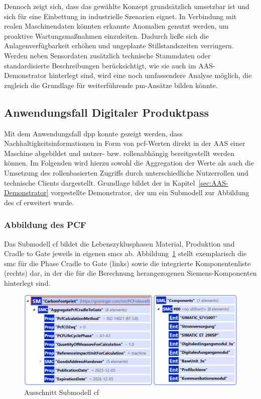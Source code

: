 Dennoch zeigt sich, dass das gewählte Konzept grundsätzlich umsetzbar ist und sich für eine Einbettung in industrielle Szenarien eignet. 
In Verbindung mit realen Maschinendaten könnten erkannte Anomalien genutzt werden, um proaktive Wartungsmaßnahmen einzuleiten. 
Dadurch ließe sich die Anlagenverfügbarkeit erhöhen und ungeplante Stillstandszeiten verringern.
Werden neben Sensordaten zusätzlich technische Stammdaten oder standardisierte Beschreibungen berücksichtigt, wie sie auch im AAS-Demonstrator hinterlegt sind, wird eine noch umfassendere Analyse möglich, die zugleich die Grundlage für weiterführende \acs{pm}-Ansätze bilden könnte.

\newpage
\subsection{Anwendungsfall Digitaler Produktpass}

Mit dem Anwendungsfall \acs{dpp} konnte gezeigt werden, dass Nachhaltigkeitsinformationen in Form von \acs{pcf}-Werten direkt in der AAS einer Maschine abgebildet und nutzer- bzw. rollenabhängig bereitgestellt werden können.
Im Folgenden wird hierzu sowohl die Aggregation der Werte als auch die Umsetzung des rollenbasierten Zugriffs durch unterschiedliche Nutzerrollen und technische Clients dargestellt.
Grundlage bildet der in Kapitel~\ref{sec:AAS-Demonstrator} vorgestellte Demonstrator, der um ein Submodell zur Abbildung des \acs{cf} erweitert wurde.

\subsubsection{Abbildung des PCF}
Das Submodell \acs{cf} bildet die Lebenszyklusphasen Material, Produktion und Cradle to Gate jeweils in eigenen \acsp{smc} ab.
Abbildung~\ref{fig:SubmodellCF} stellt exemplarisch die \acs{smc} für die Phase Cradle to Gate (links) sowie die integrierte Komponentenliste (rechts) dar, in der die für die Berechnung herangezogenen Siemens-Komponenten hinterlegt sind.

\begin{figure}[htbp]
    \centering
        \includegraphics[width=1\textwidth]{Bilder/ErgebnissePackageExplorer/CarbonFoorprintTest.png}
    \caption{Ausschnitt Submodell \acs{cf}}
    \label{fig:SubmodellCF}
\end{figure}
\vspace{-0.5em}

